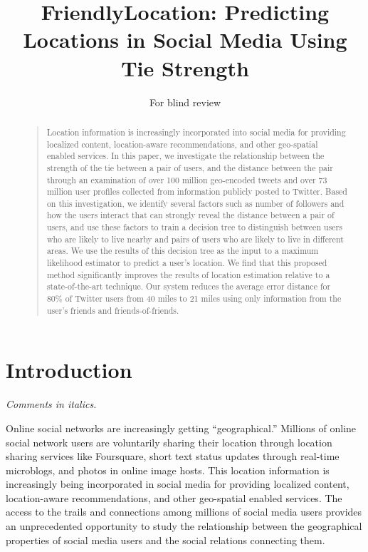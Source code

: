 \documentclass[letterpaper]{article}
\newcommand{\jam}[1]{\emph{#1}}
\newcommand{\flchap}[1]{\section{#1}}
\begin{document}
\title{FriendlyLocation: Predicting Locations in Social Media Using Tie Strength}
\author{For blind review}
\maketitle
\begin{abstract}
\begin{quote}
%
Location information is increasingly incorporated into social media for
providing localized content, location-aware recommendations, and other
geo-spatial enabled services.
%
In this paper, we investigate the relationship between the strength of the tie
between a pair of users, and the distance between the pair through an
examination of over 100 million geo-encoded tweets and
over 73 million user profiles collected from information publicly
posted to Twitter.
%
Based on this investigation, we identify several factors such as number of
followers and how the users interact that can strongly reveal the distance
between a pair of users, and use these factors to train a decision tree to
distinguish between users who are likely to live nearby and pairs of users who
are likely to live in different areas.
%
We use the results of this decision tree as the input to a maximum likelihood
estimator to predict a user's location.
%
We find that this proposed method significantly improves the results of
location estimation relative to a state-of-the-art technique.
%
Our system reduces the average error distance for 80\% of Twitter users from 40
miles to 21 miles using only information from the user's friends and
friends-of-friends.
\end{quote}
\end{abstract}

\ifdefined\THESIS
    \pagestyle{plain} %
    \setcounter{page}{1}
\else
\fi

\flchap{Introduction}

\jam{Comments in italics.}

Online social networks are increasingly getting ``geographical.''
%
Millions of online social network users are voluntarily sharing their location
through location sharing services like Foursquare, short text status updates
through real-time microblogs, and photos in online image hosts.
%
This location information is increasingly being incorporated in social media
for providing localized content, location-aware recommendations, and other
geo-spatial enabled services.
%
The access to the trails and connections among millions of social media users
provides an unprecedented opportunity to study the relationship between the
geographical properties of social media users and the social relations
connecting them.
\end{document}
